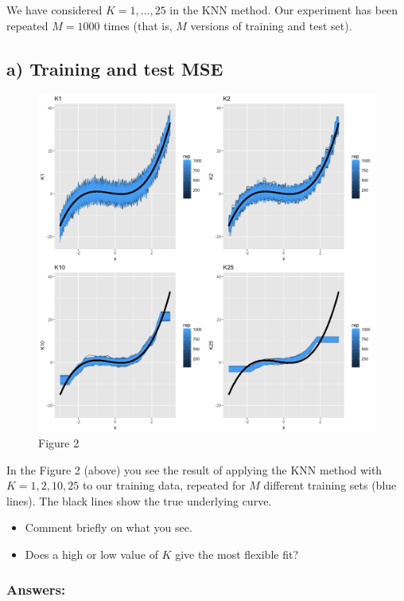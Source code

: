 \documentclass[]{article}
\providecommand{\tightlist}{%
  \setlength{\itemsep}{0pt}\setlength{\parskip}{0pt}}
\begin{document}
We have considered \(K=1,\ldots,25\) in the KNN method. Our experiment
has been repeated \(M=1000\) times (that is, \(M\) versions of training
and test set).

\subsection{a) Training and test MSE}\label{a-training-and-test-mse}

\begin{figure}
\centering
\includegraphics{Prob1f2.png}
\caption{Figure 2}
\end{figure}

In the Figure 2 (above) you see the result of applying the KNN method
with \(K=1,2,10,25\) to our training data, repeated for \(M\) different
training sets (blue lines). The black lines show the true underlying
curve.

\begin{itemize}
\tightlist
\item
  Comment briefly on what you see.
\item
  Does a high or low value of \(K\) give the most flexible fit?
\end{itemize}

\subsubsection{Answers:}\label{answers}
\end{document}

